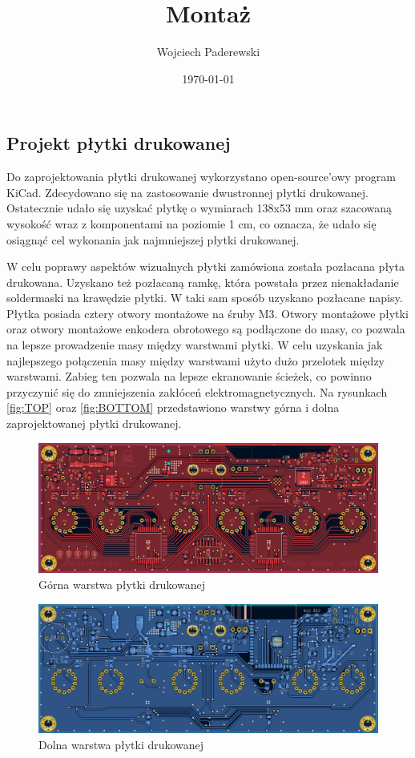 \documentclass[../main.tex]{subfiles}
\author{Wojciech Paderewski}
\date{\today}
\title{Montaż}
\begin{document}
\subsection{Projekt płytki drukowanej}
Do zaprojektowania płytki drukowanej wykorzystano open-source'owy program KiCad. Zdecydowano się na zastosowanie dwustronnej płytki drukowanej.
Ostatecznie udało się uzyskać płytkę o wymiarach 138x53 mm oraz szacowaną wysokość wraz z komponentami na poziomie 1 cm, 
co oznacza, że udało się osiągnąć cel wykonania jak najmniejszej płytki drukowanej.

W celu poprawy aspektów wizualnych płytki zamówiona została pozłacana płyta drukowana. Uzyskano też pozłacaną ramkę, która powstała przez 
nienakładanie soldermaski na krawędzie płytki. W taki sam sposób uzyskano pozłacane napisy. Płytka posiada cztery otwory montażowe na śruby M3.
Otwory montażowe płytki oraz otwory montażowe enkodera obrotowego są podłączone do masy, co pozwala na lepsze prowadzenie masy między warstwami płytki. W 
celu uzyskania jak najlepszego połączenia masy między warstwami użyto dużo przelotek między warstwami. Zabieg ten pozwala na
lepsze ekranowanie ścieżek, co powinno przyczynić się do zmniejszenia zakłóceń elektromagnetycznych. Na rysunkach \ref{fig:TOP} oraz \ref{fig:BOTTOM}
przedstawiono warstwy górna i dolna zaprojektowanej płytki drukowanej.

\begin{figure}[H]
    \centering
    \includegraphics[width=1\textwidth]{TOP.png}
    \caption{Górna warstwa płytki drukowanej}
\end{figure}

\begin{figure}[H]
    \centering
    \includegraphics[width=1\textwidth]{BOTTOM.png}
    \caption{Dolna warstwa płytki drukowanej}
\end{figure}
\end{document}
